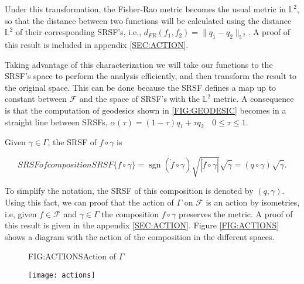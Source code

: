 Under this transformation, the Fisher-Rao metric becomes the usual metric
in $\mathbb{L}^2$, so that the distance between two functions will be
calculated using the distance $\mathbb{L}^2$ of their corresponding
SRSF's, i.e.,  $d_{FR}(f_1, f_2) = \| q_1 - q_2 \|_{\mathbb{L}^2}$. A proof of
this result is included in appendix \ref{SEC:ACTION}.

Taking advantage of this characterization we will take our functions to the
SRSF's space to perform the analysis efficiently, and then transform the result
to the original space. This can be done because the SRSF defines a map up to constant between
$\mathcal{F}$ and the space of SRSF's with the $\mathbb{L}^2$ metric.
A consequence is that the computation of geodesics shown in
\ref{FIG:GEODESIC} becomes in a straight line
between SRSFs,
$
\alpha(\tau) = (1 - \tau)q_1 + \tau q_2 \quad 0 \le \tau \le 1.
$

Given $\gamma \in \Gamma$, the SRSF of $f \circ \gamma$ is

\begin{equation}[]{SRSF of composition}
SRSF\{f \circ \gamma\} = \operatorname{sgn}(\dot{f} \circ \gamma) \sqrt{|\dot f \circ \gamma|}
\sqrt{\dot \gamma} = (q \circ \gamma) \sqrt{\dot \gamma}.
\end{equation}

To simplify the
notation, the SRSF of this composition is denoted by $(q, \gamma)$.
Using this fact, we can proof that the action of $\Gamma$ on $\mathcal{F}$ is an
action by isometries, i.e, given $f  \in \mathcal{F}$ and $\gamma \in \Gamma$
the composition $f \circ \gamma$ preserves the metric.
A proof of this result is given in the appendix \ref{SEC:ACTION}.
Figure \ref{FIG:ACTIONS} shows a diagram with the action of the composition
in the different spaces.

\begin{figure}[Action of $\Gamma$]{FIG:ACTIONS}{Action of $\Gamma$}

\texttt{[image: actions]}

\end{figure}
